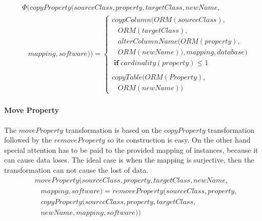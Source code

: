 \documentclass[runningheads]{comsis}
\begin{document}
\begin{align}
& \Phi(copyProperty(sourceClass, property, targetClass, newName, \nonumber \\ 
&  \; \; \; mapping, software)) = \begin{cases}
 coypColumn(ORM(sourceClass),  \\ \;\;\; ORM(targetClass),  \\ \;\;\;alterColumnName(ORM(property), \\ \;\;\; ORM(newName)), mapping, database) \\ \; \mathbf{if} \; cardinality(property) \leq 1 \\\\
 copyTable(ORM(Property), \\ \;\;\; ORM(newName))
 \end{cases}
\end{align}

\paragraph{Move Property}
The $moveProperty$ transformation is based on the $copyProperty$ transformation followed by the $removeProperty$ so its construction is easy. On the other hand special attention has to be paid to the provided mapping of instances, because it can cause data loses. The ideal case is when the mapping is surjective, then the transformation can not cause the lost of data. %
\begin{align}
& moveProperty(sourceClass, property, targetClass, newName,\nonumber  \\
& \;\;\; mapping, software) = removeProperty(sourceClass, property, \nonumber \\
& \;\;\; copyProperty(sourceClass, property, targetClass, \nonumber \\ 
& \;\;\;newName, mapping, software))
\end{align}
\end{document}
